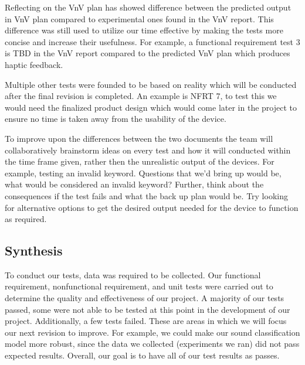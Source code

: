 \documentclass[12pt, titlepage]{article}
\begin{document}
Reflecting on the VnV plan has showed difference between the predicted output in VnV plan compared to experimental ones found in the VnV report. This difference was still used to utilize our time effective by making the tests more concise and increase their usefulness. For example, a functional requirement test 3 is TBD in the VnV report compared to the predicted VnV plan which produces haptic feedback. 
\newline

\noindent Multiple other tests were founded to be based on reality which will be conducted after the final revision is completed. An example is NFRT 7, to test this we would need the finalized product design which would come later in the project to ensure no time is taken away from the usability of the device. 
\newline

\noindent To improve upon the differences between the two documents the team will collaboratively brainstorm ideas on every test and how it will conducted within the time frame given, rather then the unrealistic output of the devices. For example, testing an invalid keyword. Questions that we'd bring up would be, what would be considered an invalid keyword? Further, think about the consequences if the test fails and what the back up plan would be. Try looking for alternative options to get the desired output needed for the device to function as required.


\subsection{Synthesis}
To conduct our tests, data was required to be collected. Our functional requirement, nonfunctional requirement, and unit tests were carried out to determine the quality and effectiveness of our project. A majority of our tests passed, some were not able to be tested at this point in the development of our project. Additionally, a few tests failed. These are areas in which we will focus our next revision to improve. For example, we could make our sound classification model more robust, since the data we collected (experiments we ran) did not pass expected results. Overall, our goal is to have all of our test results as passes. 
\end{document}

